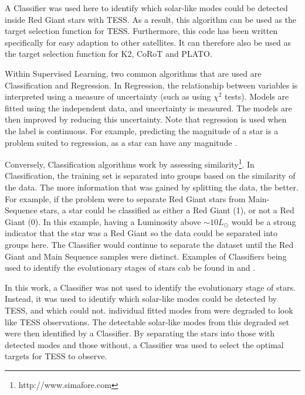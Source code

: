 \documentclass[a4paper,fleqn,usenatbib,useAMS]{mnras}
\newcommand{\pdet}{\ensuremath{P_{\rm det}\:}}
\begin{document}
A Classifier was used here to identify which solar-like modes could be detected inside Red Giant stars with TESS. As a result, this algorithm can be used as the target selection function for TESS. Furthermore, this code has been written specifically for easy adaption to other satellites. It can therefore also be used as the target selection function for K2, CoRoT and PLATO.


Within Supervised Learning, two common algorithms that are used are Classification and Regression. In Regression, the relationship between variables is interpreted using a measure of uncertainty (such as using $\chi^{2}$ tests). Models are fitted using the independent data, and uncertainty is measured. The models are then improved by reducing this uncertainty. Note that regression is used when the label is continuous. For example, predicting the magnitude of a star is a problem suited to regression, as a star can have any magnitude \citep{steinhardt_nonparametric_2018}.

Conversely, Classification algorithms work by assessing similarity\footnote{http://www.simafore.com}. In Classification, the training set is separated into groups based on the similarity of the data. The more information that was gained by splitting the data, the better. For example, if the problem were to separate Red Giant stars from Main-Sequence stars, a star could be classified as either a Red Giant (1), or not a Red Giant (0). In this example, having a Luminosity above $\sim10L_{\odot}$ would be a strong indicator that the star was a Red Giant so the data could be separated into groups here. The Classifier would continue to separate the dataset until the Red Giant and Main Sequence samples were distinct. Examples of Classifiers being used to identify the evolutionary stages of stars cab be found in \citet{ness_cannon_2015} and \citet{wu_mass_2017}.

In this work, a Classifier was not used to identify the evolutionary stage of stars. Instead, it was used to identify which solar-like modes could be detected by TESS, and which could not. individual fitted modes from \citet{davies_asteroseismology_2016} were degraded to look like TESS observations. The detectable solar-like modes from this degraded set were then identified by a Classifier. By separating the stars into those with detected modes and those without, a Classifier was used to select the optimal targets for TESS to observe.
\end{document}
